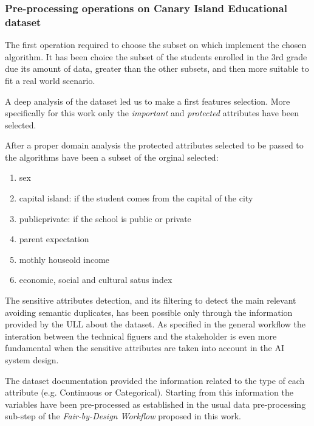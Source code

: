 \documentclass[12pt,a4paper,openright,twoside]{book}
\begin{document}
\subsubsection{Pre-processing operations on Canary Island Educational dataset}

The first operation required to choose the subset on which implement the chosen algorithm. It has been choice the subset of the students enrolled in the 3rd grade due its amount of data, greater than the other subsets, and then more suitable to fit a real world scenario.

A deep analysis of the dataset led us to make a first features selection. More specifically for this work only the \emph{important} and \emph{protected} attributes have been selected.

After a proper domain analysis the protected attributes selected to be passed to the algorithms have been a subset of the orginal selected:

\begin{enumerate}

    \item sex

    \item capital island: if the student comes from the capital of the city

    \item public\textunderscore private: if the school is public or private

    \item parent expectation
    
    \item mothly houseold income

    \item economic, social and cultural satus index

\end{enumerate}

The sensitive attributes detection, and its filtering to detect the main relevant avoiding semantic duplicates, has been possible only through the information provided by the ULL about the dataset. As specified in the general workflow the interation between the technical figuers and the stakeholder is even more fundamental when the sensitive attributes are taken into account in the AI system design.

The dataset documentation provided the information related to the type of each attribute (e.g. Continuous or Categorical). Starting from this information the variables have been pre-processed as established in the usual data pre-processing sub-step of the \emph{Fair-by-Design Workflow} proposed in this work.
\end{document}
